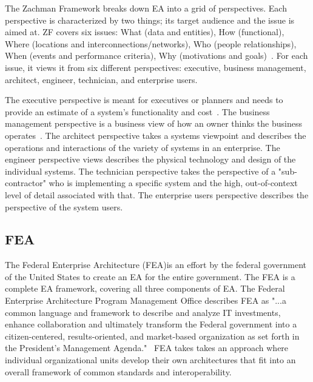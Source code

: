 The Zachman Framework breaks down EA into a grid of perspectives. Each perspective is characterized by two things; its target audience and the issue is aimed at. ZF covers six issues: What (data and entities), How (functional), Where (locations and interconnections/networks), Who (people relationships), When (events and performance criteria), Why (motivations and goals)~\cite{jungle2004}. For each issue, it views it from six different perspectives: executive, business management, architect, engineer, technician, and enterprise users. 

The executive perspective is meant for executives or planners and needs to provide an estimate of a system's functionality and cost~\cite{jungle2004}. The business management perspective is a business view of how an owner thinks the business operates~\cite{Zachman2000}. The architect perspective takes a systems viewpoint and describes the operations and interactions of the variety of systems in an enterprise. The engineer perspective views describes the physical technology and design of the individual systems. The technician perspective takes the perspective of a "sub-contractor" who is implementing a specific system and the high, out-of-context level of detail associated with that. The enterprise users perspective describes the perspective of the system users. 
 


\subsection{FEA}
The Federal Enterprise Architecture (FEA)is an effort by the federal government of the United States to create an EA for the entire government. The FEA is a complete EA framework, covering all three components of EA. The Federal Enterprise Architecture Program Management Office describes FEA as "...a common language and framework to describe and analyze IT investments, enhance collaboration and ultimately transform the Federal government into a citizen-centered, results-oriented, and market-based organization as set forth in the President's Management Agenda."~\cite{FEA_PMO2007} FEA takes takes an approach where individual organizational units develop their own architectures that fit into an overall framework of common standards and interoperability.

